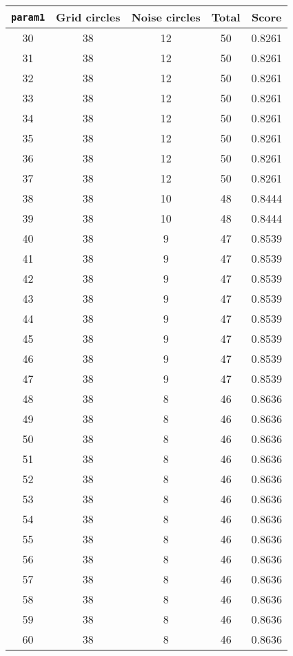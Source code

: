 \documentclass[letterpaper, 12pt]{article}
\begin{document}
\begin{longtable}{|c|c|c|c|c|}
\hline
\textbf{\texttt{param1}} & \textbf{Grid circles} & \textbf{Noise circles} & \textbf{Total} & \textbf{Score} \\
\hline
30 & 38 & 12 & 50 & 0.8261 \\
\hline
31 & 38 & 12 & 50 & 0.8261 \\
\hline
32 & 38 & 12 & 50 & 0.8261 \\
\hline
33 & 38 & 12 & 50 & 0.8261 \\
\hline
34 & 38 & 12 & 50 & 0.8261 \\
\hline
35 & 38 & 12 & 50 & 0.8261 \\
\hline
36 & 38 & 12 & 50 & 0.8261 \\
\hline
37 & 38 & 12 & 50 & 0.8261 \\
\hline
38 & 38 & 10 & 48 & 0.8444 \\
\hline
39 & 38 & 10 & 48 & 0.8444 \\
\hline
40 & 38 & 9 & 47 & 0.8539 \\
\hline
41 & 38 & 9 & 47 & 0.8539 \\
\hline
42 & 38 & 9 & 47 & 0.8539 \\
\hline
43 & 38 & 9 & 47 & 0.8539 \\
\hline
44 & 38 & 9 & 47 & 0.8539 \\
\hline
45 & 38 & 9 & 47 & 0.8539 \\
\hline
46 & 38 & 9 & 47 & 0.8539 \\
\hline
47 & 38 & 9 & 47 & 0.8539 \\
\hline
48 & 38 & 8 & 46 & 0.8636 \\
\hline
49 & 38 & 8 & 46 & 0.8636 \\
\hline
50 & 38 & 8 & 46 & 0.8636 \\
\hline
51 & 38 & 8 & 46 & 0.8636 \\
\hline
52 & 38 & 8 & 46 & 0.8636 \\
\hline
53 & 38 & 8 & 46 & 0.8636 \\
\hline
54 & 38 & 8 & 46 & 0.8636 \\
\hline
55 & 38 & 8 & 46 & 0.8636 \\
\hline
56 & 38 & 8 & 46 & 0.8636 \\
\hline
57 & 38 & 8 & 46 & 0.8636 \\
\hline
58 & 38 & 8 & 46 & 0.8636 \\
\hline
59 & 38 & 8 & 46 & 0.8636 \\
\hline
60 & 38 & 8 & 46 & 0.8636 \\
\hline

\end{longtable}
\end{document}
